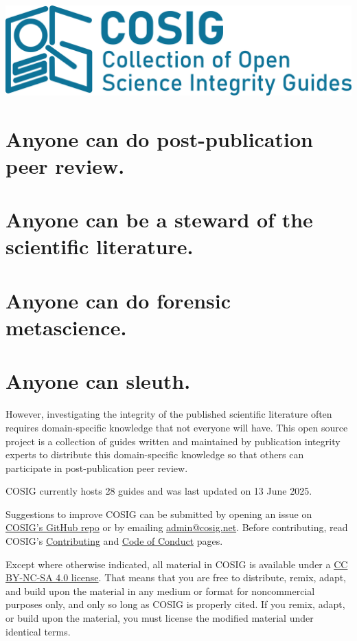 \documentclass[letterpaper, 12pt]{article}
\begin{document}
\flushleft
\includegraphics[width=\textwidth]{img/home/241017_final_logo_mockup.png}

\section*{Anyone can do post-publication peer review.}
\section*{Anyone can be a steward of the scientific literature.}
\section*{Anyone can do forensic metascience.}
\section*{Anyone can sleuth.}

However, investigating the integrity of the published scientific literature often requires domain-specific knowledge that not everyone will have. This open source project is a collection of guides written and maintained by publication integrity experts to distribute this domain-specific knowledge so that others can participate in post-publication peer review.

COSIG currently hosts 28 guides and was last updated on 13 June 2025.

Suggestions to improve COSIG can be submitted by opening an issue on \href{https://github.com/cosig-pppr/cosig/issues}{COSIG's GitHub repo} or by emailing \href{mailto:admin@cosig.net}{admin@cosig.net}. Before contributing, read COSIG's \href{https://github.com/cosig-pppr/cosig/blob/main/CONTRIBUTING.md}{Contributing} and \href{https://github.com/cosig-pppr/cosig/blob/main/CODE_OF_CONDUCT.md}{Code of Conduct} pages.

Except where otherwise indicated, all material in COSIG is available under a \href{https://creativecommons.org/licenses/by-nc-sa/4.0/deed.en}{CC BY-NC-SA 4.0 license}. That means that you are free to distribute, remix, adapt, and build upon the material in any medium or format for noncommercial purposes only, and only so long as COSIG is properly cited. If you remix, adapt, or build upon the material, you must license the modified material under identical terms.
\end{document}
